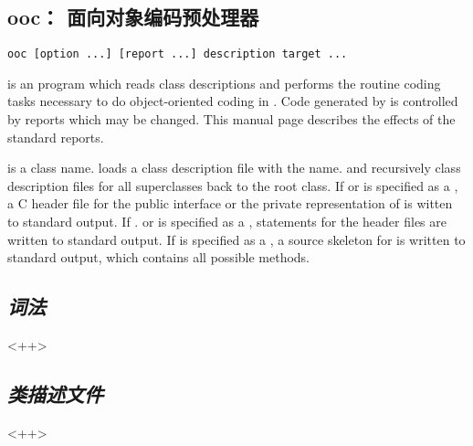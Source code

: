 \subsection{ooc： 面向对象编码预处理器}
\begin{lstlisting}[morekeywords={ooc}]
	ooc [option ...] [report ...] description target ...
\end{lstlisting}
 is an  program which reads class descriptions and
performs the routine coding tasks necessary to do object-oriented coding in
. Code generated by  is controlled by reports which
may be changed. This manual page describes the effects of the standard
reports.

 is a class name.  loads a class description
file with the name\linebreak {}. and recursively
class description files for all superclasses back to the root class. If
 or  is specified as a , a C header file for
the public interface or the private representation of  is
witten to standard output. If . or \ccbf{-} is
specified as a ,  statements for the
 header files are written to standard output. If
 is specified as a , a source skeleton for
 is written to standard output, which contains all
possible methods.


\subsection{\emph{词法}}
<++>

\subsection{\emph{类描述文件}}
<++>

